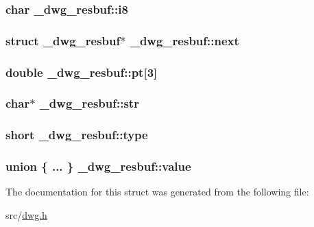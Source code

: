 \hypertarget{struct__dwg__resbuf_a30dff0d6577261162488f9a7e199469e}{
\subsubsection[{i8}]{\setlength{\rightskip}{0pt plus 5cm}char {\bf \-\_\-dwg\-\_\-resbuf\-::i8}}}\label{struct__dwg__resbuf_a30dff0d6577261162488f9a7e199469e}
\hypertarget{struct__dwg__resbuf_a0afd91fd6517fbc08871040dd9f7027c}{
\subsubsection[{next}]{\setlength{\rightskip}{0pt plus 5cm}struct {\bf \-\_\-dwg\-\_\-resbuf}$\ast$ {\bf \-\_\-dwg\-\_\-resbuf\-::next}}}\label{struct__dwg__resbuf_a0afd91fd6517fbc08871040dd9f7027c}
\hypertarget{struct__dwg__resbuf_a1b6c76927f901d8e6c7ef12b4be5a67d}{
\subsubsection[{pt}]{\setlength{\rightskip}{0pt plus 5cm}double {\bf \-\_\-dwg\-\_\-resbuf\-::pt}\mbox{[}3\mbox{]}}}\label{struct__dwg__resbuf_a1b6c76927f901d8e6c7ef12b4be5a67d}
\hypertarget{struct__dwg__resbuf_a861556bab1d49fe104ade77486bf9204}{
\subsubsection[{str}]{\setlength{\rightskip}{0pt plus 5cm}char$\ast$ {\bf \-\_\-dwg\-\_\-resbuf\-::str}}}\label{struct__dwg__resbuf_a861556bab1d49fe104ade77486bf9204}
\hypertarget{struct__dwg__resbuf_a226066855831815f2df282214a678bd2}{
\subsubsection[{type}]{\setlength{\rightskip}{0pt plus 5cm}short {\bf \-\_\-dwg\-\_\-resbuf\-::type}}}\label{struct__dwg__resbuf_a226066855831815f2df282214a678bd2}
\hypertarget{struct__dwg__resbuf_a5270cd5e753e593c02035ed508e92338}{
\subsubsection[{value}]{\setlength{\rightskip}{0pt plus 5cm}union \{ ... \}   {\bf \-\_\-dwg\-\_\-resbuf\-::value}}}\label{struct__dwg__resbuf_a5270cd5e753e593c02035ed508e92338}


\-The documentation for this struct was generated from the following file\-:\begin{DoxyCompactItemize}
\item 
src/\hyperlink{dwg_8h}{dwg.\-h}\end{DoxyCompactItemize}
